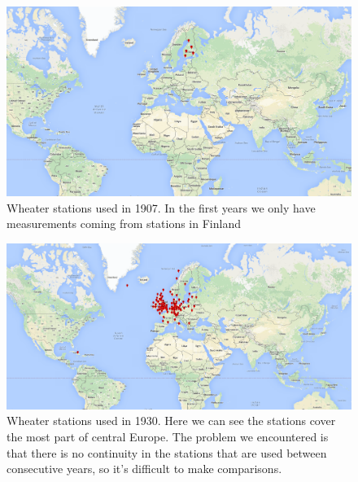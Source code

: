 \documentclass{vldb}
\begin{document}
\begin{figure}[tbh]
\includegraphics[width=1\linewidth]{stations1907}
\caption{Wheater stations used in 1907. In the first years we only have measurements coming from stations in Finland}
\label{fig:stations1907}
\end{figure}
\begin{figure}[tbh]
\includegraphics[width=1\linewidth]{stations1930}
\caption{Wheater stations used in 1930. Here we can see the stations cover the most part of central Europe. The problem we encountered is that there is no continuity in the stations that are used between consecutive years, so it's difficult to make comparisons.}
\label{fig:stations1930}
\end{figure}
\end{document}
